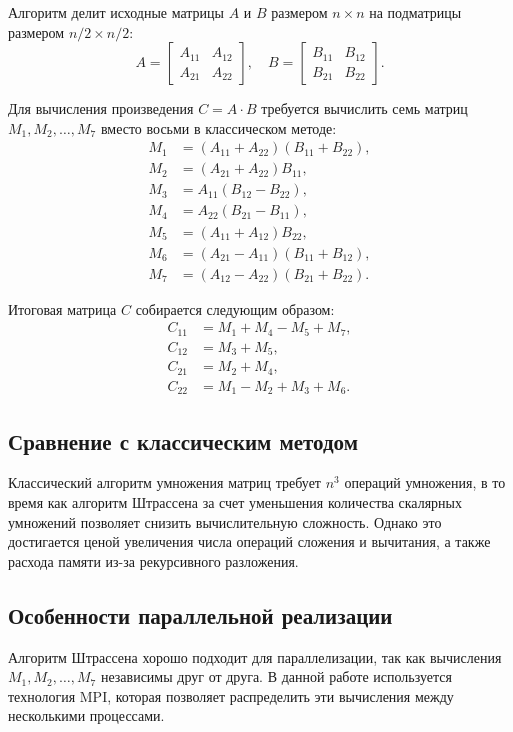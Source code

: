 \documentclass[a4paper, 14pt]{extarticle}
\begin{document}
Алгоритм делит исходные матрицы \(A\) и \(B\) размером \(n \times n\) на подматрицы размером \(n/2 \times n/2\):
\[
A = \begin{bmatrix}
A_{11} & A_{12} \\
A_{21} & A_{22}
\end{bmatrix}, \quad
B = \begin{bmatrix}
B_{11} & B_{12} \\
B_{21} & B_{22}
\end{bmatrix}.
\]

Для вычисления произведения \(C = A \cdot B\) требуется вычислить семь матриц \(M_1, M_2, \dots, M_7\) вместо восьми в классическом методе:
\[
\begin{aligned}
M_1 &= (A_{11} + A_{22})(B_{11} + B_{22}), \\
M_2 &= (A_{21} + A_{22})B_{11}, \\
M_3 &= A_{11}(B_{12} - B_{22}), \\
M_4 &= A_{22}(B_{21} - B_{11}), \\
M_5 &= (A_{11} + A_{12})B_{22}, \\
M_6 &= (A_{21} - A_{11})(B_{11} + B_{12}), \\
M_7 &= (A_{12} - A_{22})(B_{21} + B_{22}).
\end{aligned}
\]

Итоговая матрица \(C\) собирается следующим образом:
\[
\begin{aligned}
C_{11} &= M_1 + M_4 - M_5 + M_7, \\
C_{12} &= M_3 + M_5, \\
C_{21} &= M_2 + M_4, \\
C_{22} &= M_1 - M_2 + M_3 + M_6.
\end{aligned}
\]

\subsection{Сравнение с классическим методом}
Классический алгоритм умножения матриц требует \(n^3\) операций умножения, в то время как алгоритм Штрассена за счет уменьшения количества скалярных умножений позволяет снизить вычислительную сложность. Однако это достигается ценой увеличения числа операций сложения и вычитания, а также расхода памяти из-за рекурсивного разложения.

\subsection{Особенности параллельной реализации}
Алгоритм Штрассена хорошо подходит для параллелизации, так как вычисления \(M_1, M_2, \dots, M_7\) независимы друг от друга. В данной работе используется технология MPI, которая позволяет распределить эти вычисления между несколькими процессами.
\end{document}
